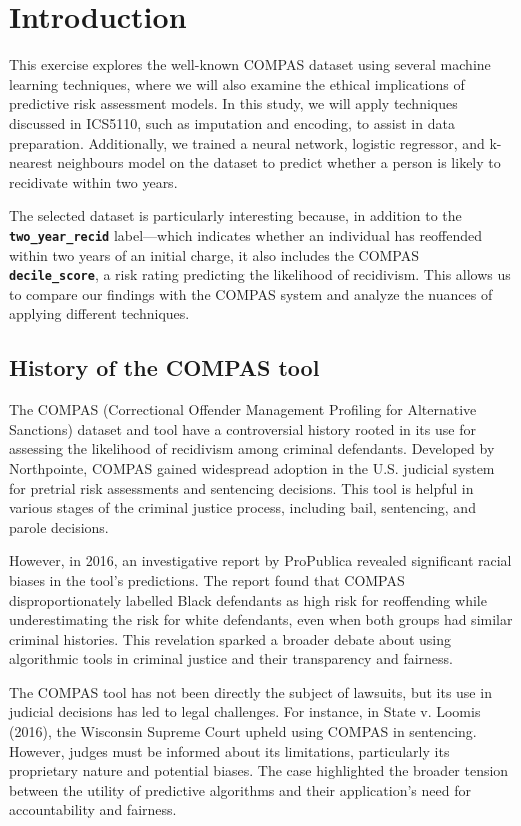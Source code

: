 \section{Introduction}
	This exercise explores the well-known COMPAS dataset using several machine learning techniques, where we will also examine the ethical implications of predictive risk assessment models. In this study, we will apply techniques discussed in ICS5110, such as imputation and encoding, to assist in data preparation. Additionally, we trained a neural network, logistic regressor, and k-nearest neighbours model on the dataset to predict whether a person is likely to recidivate within two years.
	
	The selected dataset is particularly interesting because, in addition to the \textbf{\texttt{two\_year\_recid}} label—which indicates whether an individual has reoffended within two years of an initial charge, it also includes the COMPAS \textbf{\texttt{decile\_score}}, a risk rating predicting the likelihood of recidivism. This allows us to compare our findings with the COMPAS system and analyze the nuances of applying different techniques.



\subsection{History of the COMPAS tool}

	The COMPAS (Correctional Offender Management Profiling for Alternative Sanctions)\cite{wikipediaCOMPAS} dataset and tool have a controversial history rooted in its use for assessing the likelihood of recidivism among criminal defendants. Developed by Northpointe, COMPAS gained widespread adoption in the U.S. judicial system for pretrial risk assessments and sentencing decisions. This tool is helpful in various stages of the criminal justice process, including bail, sentencing, and parole decisions.
	
	However, in 2016, an investigative report by ProPublica\cite{larson2016compas} revealed significant racial biases in the tool's predictions. The report found that COMPAS disproportionately labelled Black defendants as high risk for reoffending while underestimating the risk for white defendants, even when both groups had similar criminal histories. This revelation sparked a broader debate about using algorithmic tools in criminal justice and their transparency and fairness. 
	
	The COMPAS tool has not been directly the subject of lawsuits, but its use in judicial decisions has led to legal challenges. For instance, in State v. Loomis (2016)\cite{harvard2017loomis}, the Wisconsin Supreme Court upheld using COMPAS in sentencing. However, judges must be informed about its limitations, particularly its proprietary nature and potential biases. The case highlighted the broader tension between the utility of predictive algorithms and their application's need for accountability and fairness.

